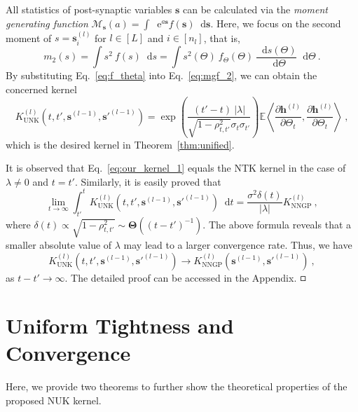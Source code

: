 \documentclass[review,10pt]{JMtemplate}
\newcommand*{\dif}{\mathop{}\!\mathrm{d}}
\newcommand*{\e}{\mathop{}\!\mathrm{e}}
\begin{document}
All statistics of post-synaptic variables $\boldsymbol{s}$ can be calculated via the \emph{moment generating function} $\mathcal{M}_{\boldsymbol{s}} (a) = \int \e^{a \boldsymbol{s}}  f(\boldsymbol{s}) \dif \boldsymbol{s}$. Here, we focus on the second moment of $s= \boldsymbol{s}^{(l)}_i$ for $l \in [L]$ and $i \in [n_l]$, that is,
\begin{equation} \label{eq:mgf_2}
	m_2 (s) = \int s^2  ~f(s) \dif s = \int s^2(\Theta)  ~f_{\Theta}(\Theta) ~\frac{\dif s(\Theta)}{\dif \Theta} \dif \Theta \ .
\end{equation}
By substituting Eq.~\eqref{eq:f_theta} into Eq.~\eqref{eq:mgf_2}, we can obtain the concerned kernel
\[
K_{\textrm{UNK}}^{(l)} \left( t, t', \boldsymbol{s}^{(l-1)}, \boldsymbol{s}'^{(l-1)} \right)  = \exp\left( \frac{ (t'-t) ~|\lambda|}{ \sqrt{1-\rho_{t,t'}^2}\sigma_{t}\sigma_{t'} } \right) \mathbb{E} \left\langle \frac{\partial \boldsymbol{h}^{(l)}}{\partial \Theta_t} , \frac{\partial \boldsymbol{h}^{(l)}}{\partial \Theta_t}  \right\rangle \ ,
\]
which is the desired kernel in Theorem~\ref{thm:unified}. 

It is observed that Eq.~\eqref{eq:our_kernel_1} equals the NTK kernel in the case of $\lambda \neq 0$ and $t=t'$. Similarly, it is easily proved that 
\[
\lim\limits_{t\to\infty} \int_{t'}^t K_{\textrm{UNK}}^{(l)} \left( t, t', \boldsymbol{s}^{(l-1)}, \boldsymbol{s}'^{(l-1)} \right) \dif t = \frac{\sigma^2 \delta(t)}{|\lambda|} K_{\textrm{NNGP}}^{(l)} \ ,
\]
where $\delta(t) \propto \sqrt{1-\rho_{t,t'}^2} \sim \mathbf{\Theta}((t-t')^{-1})$. The above formula reveals that a smaller absolute value of $\lambda$ may lead to a larger convergence rate. Thus, we have
\[
K_{\textrm{UNK}}^{(l)} \left( t, t', \boldsymbol{s}^{(l-1)}, \boldsymbol{s}'^{(l-1)} \right) \to K_{\textrm{NNGP}}^{(l)} \left(  \boldsymbol{s}^{(l-1)}, \boldsymbol{s}'^{(l-1)} \right) \ ,
\]
as $t-t' \to \infty$. The detailed proof can be accessed in the Appendix. $\hfill\square$



\section{Uniform Tightness and Convergence}  \label{sec:properties}
Here, we provide two theorems to further show the theoretical properties of the proposed NUK kernel.
\end{document}
